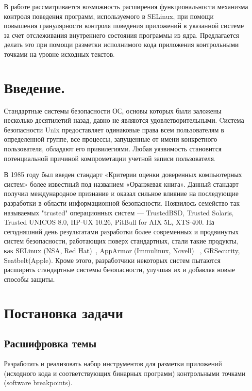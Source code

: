 {} 

{\large В работе рассматривается возможность расширения функциональности
механизма контроля поведения программ, используемого в SELinux, при 
помощи повышения гранулярности контроля поведения приложений
в указанной системе за счет отслеживания внутреннего состояния
программы из ядра. Предлагается делать это при помощи
разметки исполнимого кода приложения контрольными точками 
на уровне исходных текстов. 
}

\newpage
\tableofcontents
\newpage

\bigskip 
\section{Введение.}

Стандартные системы безопасности ОС, основы которых 
были заложены несколько десятилетий назад, давно не 
являются удовлетворительными. Cистема 
безопасности Unix предоставляет одинаковые права всем 
пользователям в определенной группе, все процессы, 
запущенные от имени конкретного пользователя, обладают 
его привилегиями. Любая уязвимость становится 
потенциальной причиной компрометации учетной записи 
пользователя. 

В 1985 году был введен стандарт «Критерии 
оценки доверенных компьютерных систем» более известный 
под названием «Оранжевая книга». Данный стандарт получил 
международное признание и оказал сильное влияние на 
последующие разработки в области информационной безопасности. 
Появилось семейство так называемых "trusted" операционных 
систем — TrustedBSD, Trusted Solaris, Trusted UNICOS 8.0, 
HP-UX 10.26, PitBull for AIX 5L, XTS-400. На сегодняшний 
день результатами разработки 
более современных и продвинутых систем безопасности, 
работающих поверх стандартных, стали такие продукты, как 
SELinux (NSA, Red Hat)~\cite{SEOF}, AppArmor (Immulinux, Novell) 
~\cite{AppArmor},
GRSecurity\cite{pax}, Seatbelt(Apple). Кроме этого, разработчики 
некоторых систем пытаются расширить стандартные системы 
безопасности, улучшая их и добавляя новые способы защиты.

\section{Постановка задачи}
\subsection{Расшифровка темы}
Разработать и реализовать набор инструментов для
разметки приложений (исходного кода и соответствующих бинарных программ)
контрольными точками (software breakpoints).


